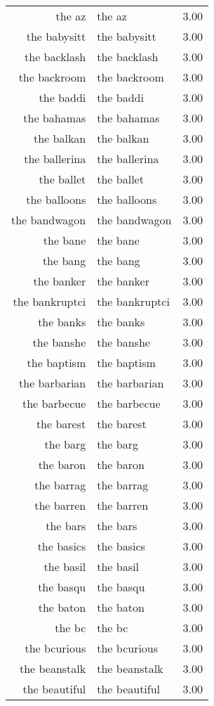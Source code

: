 \begin{table}[ht]
\begin{tabular}{rlr}
  the az & the az & 3.00 \\ 
  the babysitt & the babysitt & 3.00 \\ 
  the backlash & the backlash & 3.00 \\ 
  the backroom & the backroom & 3.00 \\ 
  the baddi & the baddi & 3.00 \\ 
  the bahamas & the bahamas & 3.00 \\ 
  the balkan & the balkan & 3.00 \\ 
  the ballerina & the ballerina & 3.00 \\ 
  the ballet & the ballet & 3.00 \\ 
  the balloons & the balloons & 3.00 \\ 
  the bandwagon & the bandwagon & 3.00 \\ 
  the bane & the bane & 3.00 \\ 
  the bang & the bang & 3.00 \\ 
  the banker & the banker & 3.00 \\ 
  the bankruptci & the bankruptci & 3.00 \\ 
  the banks & the banks & 3.00 \\ 
  the banshe & the banshe & 3.00 \\ 
  the baptism & the baptism & 3.00 \\ 
  the barbarian & the barbarian & 3.00 \\ 
  the barbecue & the barbecue & 3.00 \\ 
  the barest & the barest & 3.00 \\ 
  the barg & the barg & 3.00 \\ 
  the baron & the baron & 3.00 \\ 
  the barrag & the barrag & 3.00 \\ 
  the barren & the barren & 3.00 \\ 
  the bars & the bars & 3.00 \\ 
  the basics & the basics & 3.00 \\ 
  the basil & the basil & 3.00 \\ 
  the basqu & the basqu & 3.00 \\ 
  the baton & the baton & 3.00 \\ 
  the bc & the bc & 3.00 \\ 
  the bcurious & the bcurious & 3.00 \\ 
  the beanstalk & the beanstalk & 3.00 \\ 
  the beautiful & the beautiful & 3.00 \\ 

\end{tabular}
\end{table}
